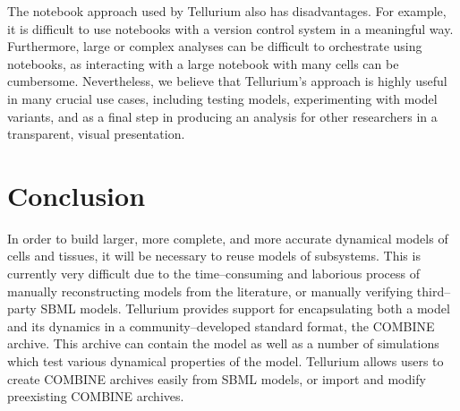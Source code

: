 \documentclass[10pt,letterpaper]{article}
\begin{document}
The notebook approach used by Tellurium also has disadvantages. For example, it is difficult to use notebooks with a version control system in a meaningful way. Furthermore, large or complex analyses can be difficult to orchestrate using notebooks, as interacting with a large notebook with many cells can be cumbersome. %
Nevertheless, we believe that Tellurium's approach is highly useful in many crucial use cases, including testing models, experimenting with model variants, and as a final step in producing an analysis for other researchers in a transparent, visual presentation.


\section*{Conclusion}

In order to build larger, more complete, and more accurate dynamical models of cells and tissues, it will be necessary to reuse models of subsystems. This is currently very difficult due to the time--consuming and laborious process of manually reconstructing models from the literature, or manually verifying third--party SBML models. Tellurium provides support for encapsulating both a model and its dynamics in a community--developed standard format, the COMBINE archive. This archive can contain the model as well as a number of simulations which test various dynamical properties of the model. Tellurium allows users to create COMBINE archives easily from SBML models, or import and modify preexisting COMBINE archives.
\end{document}
